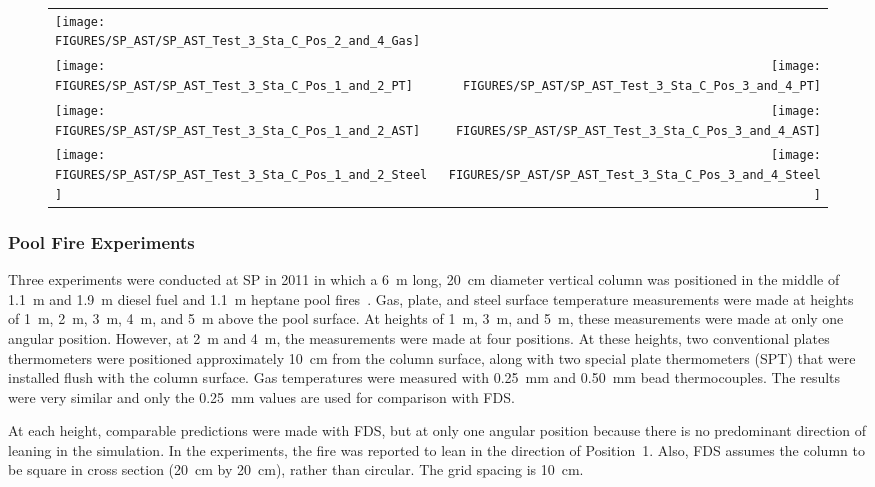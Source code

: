 \begin{figure}[p]
\begin{tabular*}{\textwidth}{l@{\extracolsep{\fill}}r}
\texttt{[image: FIGURES/SP\_AST/SP\_AST\_Test\_3\_Sta\_C\_Pos\_2\_and\_4\_Gas]} &
  \\
\texttt{[image: FIGURES/SP\_AST/SP\_AST\_Test\_3\_Sta\_C\_Pos\_1\_and\_2\_PT]} &
\texttt{[image: FIGURES/SP\_AST/SP\_AST\_Test\_3\_Sta\_C\_Pos\_3\_and\_4\_PT]} \\
\texttt{[image: FIGURES/SP\_AST/SP\_AST\_Test\_3\_Sta\_C\_Pos\_1\_and\_2\_AST]} &
\texttt{[image: FIGURES/SP\_AST/SP\_AST\_Test\_3\_Sta\_C\_Pos\_3\_and\_4\_AST]} \\
\texttt{[image: FIGURES/SP\_AST/SP\_AST\_Test\_3\_Sta\_C\_Pos\_1\_and\_2\_Steel]} &
\texttt{[image: FIGURES/SP\_AST/SP\_AST\_Test\_3\_Sta\_C\_Pos\_3\_and\_4\_Steel]}
\end{tabular*}
\label{SP_Test_3_Station_C}
\end{figure}

\clearpage

\subsubsection{Pool Fire Experiments}

Three experiments were conducted at SP in 2011 in which a 6~m long, 20~cm diameter vertical column was positioned in the middle of 1.1~m and 1.9~m diesel fuel and 1.1~m heptane
pool fires~\cite{Sjostrom:AST}. Gas, plate, and steel surface temperature measurements were made at heights of 1~m, 2~m, 3~m, 4~m, and 5~m above the pool surface. At heights of 1~m, 3~m, and 5~m, these measurements were made at only one angular position. However, at 2~m and 4~m, the measurements were made at four positions. At these heights, two conventional plates thermometers were positioned approximately 10~cm from the column surface, along with two special plate thermometers (SPT) that were installed flush with the column surface. Gas temperatures were measured with 0.25~mm and 0.50~mm bead thermocouples. The results were very similar and only the 0.25~mm values are used for comparison with FDS.

At each height, comparable predictions were made with FDS, but at only one angular position because there is no predominant direction of leaning in the simulation. In the experiments, the fire was reported to lean in the direction of Position~1. Also, FDS assumes the column to be square in cross section (20~cm by 20~cm), rather than circular. The grid spacing is 10~cm.

